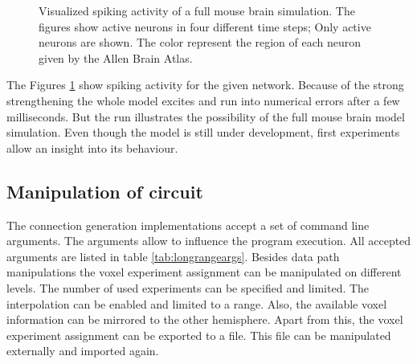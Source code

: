\begin{figure}[ht!]
\begin{center}
{		}
    \end{center}
    \caption{%
        Visualized spiking activity of a full mouse brain simulation.
        The figures show active neurons in four different time steps;
        Only active neurons are shown.
        The color represent the region of each neuron given by the Allen Brain Atlas.
     }%
   \label{fig:sim}
\end{figure}
The Figures \ref{fig:sim} show spiking activity for the given network.
Because of the strong strengthening the whole model excites and run into numerical errors
after a few milliseconds. But the run illustrates the possibility of the full mouse brain model
simulation. Even though the model is still under development, first experiments allow an insight 
into its behaviour.

\subsection{Manipulation of circuit}

The connection generation implementations accept a set of command line arguments.
The arguments allow to influence the program execution.
All accepted arguments are listed in table \ref{tab:longrangeargs}.
Besides data path manipulations the voxel experiment assignment can be 
manipulated on different levels. The number of used experiments can be specified
and limited. The interpolation can be enabled and limited to a range.
Also, the available voxel information can be mirrored to the other hemisphere.
Apart from this, the voxel experiment assignment can be exported to a file.
This file can be manipulated externally and imported again.

